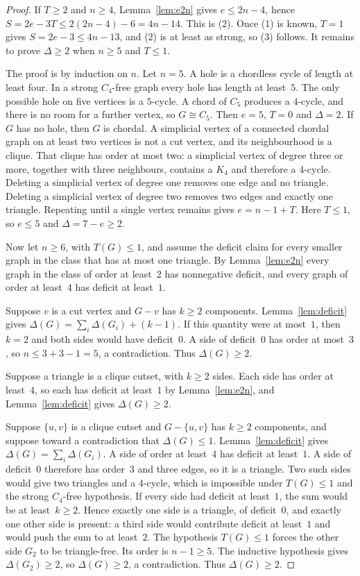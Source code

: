 \documentclass[ASNA]{USG}
\theoremstyle{WBstyletwo}
\numberwithin{equation}{section}
\begin{document}
\begin{proof}
If $T\ge 2$ and $n\ge 4$, Lemma~\ref{lem:e2n} gives $e\le 2n-4$, hence $S=2e-3T\le 2(2n-4)-6=4n-14$. This is (2). Once (1) is known, $T=1$ gives $S=2e-3\le 4n-13$, and (2) is at least as strong, so (3) follows. It remains to prove $\Delta\ge 2$ when $n\ge 5$ and $T\le 1$.

The proof is by induction on $n$. Let $n=5$. A hole is a chordless cycle of length at least four. In a strong $C_4$-free graph every hole has length at least~$5$. The only possible hole on five vertices is a $5$-cycle. A chord of $C_5$ produces a $4$-cycle, and there is no room for a further vertex, so $G\cong C_5$. Then $e=5$, $T=0$ and $\Delta=2$. If $G$ has no hole, then $G$ is chordal. A simplicial vertex of a connected chordal graph on at least two vertices is not a cut vertex, and its neighbourhood is a clique. That clique has order at most two: a simplicial vertex of degree three or more, together with three neighbours, contains a $K_4$ and therefore a $4$-cycle. Deleting a simplicial vertex of degree one removes one edge and no triangle. Deleting a simplicial vertex of degree two removes two edges and exactly one triangle. Repeating until a single vertex remains gives $e=n-1+T$. Here $T\le 1$, so $e\le 5$ and $\Delta=7-e\ge 2$.

Now let $n\ge 6$, with $T(G)\le 1$, and assume the deficit claim for every smaller graph in the class that has at most one triangle. By Lemma~\ref{lem:e2n} every graph in the class of order at least~$2$ has nonnegative deficit, and every graph of order at least~$4$ has deficit at least~$1$.

Suppose $v$ is a cut vertex and $G-v$ has $k\ge 2$ components. Lemma~\ref{lem:deficit} gives $\Delta(G)=\sum_i\Delta(G_i)+(k-1)$. If this quantity were at most~$1$, then $k=2$ and both sides would have deficit~$0$. A side of deficit~$0$ has order at most~$3$, so $n\le 3+3-1=5$, a contradiction. Thus $\Delta(G)\ge 2$.

Suppose a triangle is a clique cutset, with $k\ge 2$ sides. Each side has order at least~$4$, so each has deficit at least~$1$ by Lemma~\ref{lem:e2n}, and Lemma~\ref{lem:deficit} gives $\Delta(G)\ge 2$.

Suppose $\{u,v\}$ is a clique cutset and $G-\{u,v\}$ has $k\ge 2$ components, and suppose toward a contradiction that $\Delta(G)\le 1$. Lemma~\ref{lem:deficit} gives $\Delta(G)=\sum_i\Delta(G_i)$. A side of order at least~$4$ has deficit at least~$1$. A side of deficit~$0$ therefore has order~$3$ and three edges, so it is a triangle. Two such sides would give two triangles and a $4$-cycle, which is impossible under $T(G)\le 1$ and the strong $C_4$-free hypothesis. If every side had deficit at least~$1$, the sum would be at least~$k\ge 2$. Hence exactly one side is a triangle, of deficit~$0$, and exactly one other side is present: a third side would contribute deficit at least~$1$ and would push the sum to at least~$2$. The hypothesis $T(G)\le 1$ forces the other side $G_2$ to be triangle-free. Its order is $n-1\ge 5$. The inductive hypothesis gives $\Delta(G_2)\ge 2$, so $\Delta(G)\ge 2$, a contradiction. Thus $\Delta(G)\ge 2$.


\end{proof}
\end{document}
